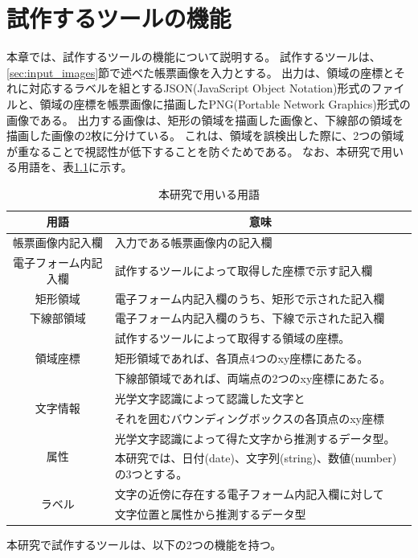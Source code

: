 \chapter{試作するツールの機能}\label{cha:Function}
本章では、試作するツールの機能について説明する。
試作するツールは、\ref{sec:input_images}節で述べた帳票画像を入力とする。
出力は、領域の座標とそれに対応するラベルを組とするJSON(JavaScript Object Notation)形式のファイルと、領域の座標を帳票画像に描画したPNG(Portable Network Graphics)形式の画像である。
出力する画像は、矩形の領域を描画した画像と、下線部の領域を描画した画像の2枚に分けている。
これは、領域を誤検出した際に、2つの領域が重なることで視認性が低下することを防ぐためである。
なお、本研究で用いる用語を、表\ref{tb:term}に示す。
\begin{table}[tp]
	\caption{本研究で用いる用語}
	\label{tb:term}
	\centering
	\begin{tabular}{|c||l|}
        \hline
		用語 & \multicolumn{1}{c|}{意味} \\
        \hline \hline
		帳票画像内記入欄 & 入力である帳票画像内の記入欄 \\
        \hline
		電子フォーム内記入欄 & 試作するツールによって取得した座標で示す記入欄 \\
        \hline
		矩形領域 & 電子フォーム内記入欄のうち、矩形で示された記入欄 \\
        \hline
		下線部領域 & 電子フォーム内記入欄のうち、下線で示された記入欄 \\
        \hline
        \multirow{3}{*}{領域座標} & 試作するツールによって取得する領域の座標。 \\
                                    & 矩形領域であれば、各頂点4つのxy座標にあたる。 \\
                                    & 下線部領域であれば、両端点の2つのxy座標にあたる。 \\
        \hline
        \multirow{2}{*}{文字情報} & 光学文字認識によって認識した文字と \\
                                    & それを囲むバウンディングボックスの各頂点のxy座標 \\
        \hline
        \multirow{2}{*}{属性} & 光学文字認識によって得た文字から推測するデータ型。 \\
                                & 本研究では、日付(date)、文字列(string)、数値(number)の3つとする。\\
        \hline
        \multirow{2}{*}{ラベル} & 文字の近傍に存在する電子フォーム内記入欄に対して \\
                                & 文字位置と属性から推測するデータ型 \\
        \hline
	\end{tabular}
\end{table}
本研究で試作するツールは、以下の2つの機能を持つ。


